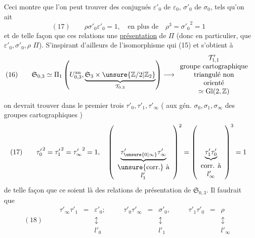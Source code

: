 Ceci montre que l'on peut trouver
des conjugués $\varepsilon'_0$ de $\varepsilon_0$, $\sigma'_0$ de $\sigma_0$,
tels qu'on ait
\[
(17)\qquad
\rho\sigma'_0\varepsilon'_0=1,\quad
\text{en plus de}\quad \rho^3={\sigma'_0}^{2}=1
\]
et de telle façon que ces relations 
une \uline{présentation} de $\Pi$ (donc en particulier,
que $\varepsilon'_0,\sigma'_0,\rho$  \unsure{$\}$} $\Pi$).
S'inspirant d'ailleurs de l'isomorphisme  qui
 (15) et s'obtient à 
\[
(16)\qquad
\mathfrak{S}_{0,3}
\simeq\Pi_1\left(U_{0,3}^{\mathrm{an}},
\underbrace{\mathfrak{S}_3\times\unsure{\mathbb{Z}/2|\mathbb{Z}_2}}_{\mathcal{T}_{0,3}}\right)
\longrightarrow
\begin{array}{c}
\mathcal{T}'_{1,1}\\
\text{groupe cartographique}\\
\text{triangulé non}\\
\text{orienté}\\
\simeq\mathrm{Gl}(2,\mathbb{Z})
\end{array}
\]
on devrait trouver dans le premier 
trois  $\tau'_0,\tau'_1,\tau'_\infty$
( aux gén. 
$\sigma_0,\sigma_1,\sigma_\infty$ des groupes cartographiques
) 
\[
(17)\qquad
{\tau'_0}^{2}={\tau'_1}^{2}={\tau'_\infty}^{2}=1,\quad
\left(\underbrace{\tau'_{\unsure{0|\infty}}\tau'_\infty}_{\begin{array}{c}\text{\unsure{corr.} à}\\l'_1\end{array}}\right)^2
=\left(\underbrace{\tau'_1\tau'_0}_{\begin{array}{c}\text{corr. à}\\l'_\infty\end{array}}\right)^3=1
\]
de telle façon que ce soient là  des
relations de présentation de $\mathfrak{S}_{0,3}$.
Il faudrait que
\[
(18)\qquad
\begin{array}{rclcrclcrcl}
\tau'_\infty\tau'_1&=&\varepsilon'_0;&\quad&
\tau'_0\tau'_\infty&=&\sigma'_0,&\quad&
\tau'_1\tau'_0&=&\rho\\
&&\updownarrow&&&&\updownarrow&&&&\updownarrow\\
&&l'_0&&&&l'_1&&&&l'_\infty
\end{array}
\]
